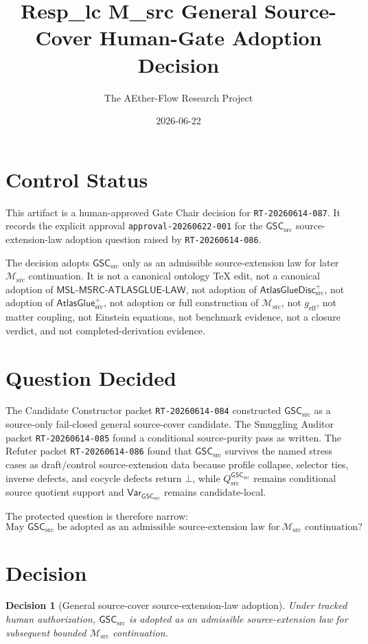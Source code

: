 \documentclass[11pt]{article}
\title{Resp\_lc M\_src General Source-Cover Human-Gate Adoption Decision}
\author{The AEther-Flow Research Project}
\date{2026-06-22}
\newcommand{\Msrc}{\mathcal{M}_{\mathrm{src}}}
\newcommand{\geff}{g_{\mathrm{eff}}}
\newcommand{\AtlasGlue}{\mathsf{AtlasGlue}_{\mathrm{src}}^{+}}
\newcommand{\AtlasGlueDisc}{\mathsf{AtlasGlueDisc}_{\mathrm{src}}^{+}}
\newcommand{\MSL}{\mathsf{MSL}\mbox{-}\mathsf{MSRC}\mbox{-}\mathsf{ATLASGLUE}\mbox{-}\mathsf{LAW}}
\newcommand{\GSC}{\mathsf{GSC}_{\mathrm{src}}}
\newcommand{\Vargsc}{\mathsf{Var}_{\GSC}}
\newcommand{\Qsrc}{Q_{\mathrm{src}}^{\GSC}}
\newcommand{\Bot}{\bot}
\newtheorem{decision}{Decision}
\begin{document}
\maketitle

\section*{Control Status}

This artifact is a human-approved Gate Chair decision for
\texttt{RT-20260614-087}. It records the explicit approval
\texttt{approval-20260622-001} for the \(\GSC\) source-extension-law
adoption question raised by \texttt{RT-20260614-086}.

The decision adopts \(\GSC\) only as an admissible source-extension law for
later \(\Msrc\) continuation. It is not a canonical ontology TeX edit, not a
canonical adoption of \(\MSL\), not adoption of \(\AtlasGlueDisc\), not
adoption of \(\AtlasGlue\), not adoption or full construction of \(\Msrc\),
not \(\geff\), not matter coupling, not Einstein equations, not benchmark
evidence, not a closure verdict, and not completed-derivation evidence.

\section{Question Decided}

The Candidate Constructor packet \texttt{RT-20260614-084} constructed
\(\GSC\) as a source-only fail-closed general source-cover candidate. The
Smuggling Auditor packet \texttt{RT-20260614-085} found a conditional
source-purity pass as written. The Refuter packet \texttt{RT-20260614-086}
found that \(\GSC\) survives the named stress cases as draft/control
source-extension data because profile collapse, selector ties, inverse
defects, and cocycle defects return \(\Bot\), while \(\Qsrc\) remains
conditional source quotient support and \(\Vargsc\) remains candidate-local.

The protected question is therefore narrow:
\[
\text{May }\GSC\text{ be adopted as an admissible source-extension law for}
\ \Msrc\text{ continuation?}
\]

\section{Decision}

\begin{decision}[General source-cover source-extension-law adoption]
Under tracked human authorization, \(\GSC\) is adopted as an admissible
source-extension law for subsequent bounded \(\Msrc\) continuation.
\end{decision}
\end{document}

